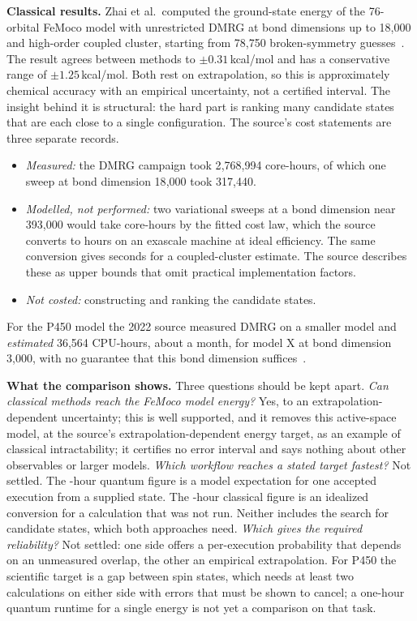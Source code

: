 \documentclass[10pt,a4paper]{article}
\begin{document}
\textbf{Classical results.} Zhai et al.\ computed the ground-state energy of the 76-orbital FeMoco model with unrestricted DMRG at bond dimensions up to 18{,}000 and high-order coupled cluster, starting from 78{,}750 broken-symmetry guesses~\cite{zhai2026}. The result agrees between methods to $\pm0.31$\,kcal/mol and has a conservative range of $\pm1.25$\,kcal/mol. Both rest on extrapolation, so this is approximately chemical accuracy with an empirical uncertainty, not a certified interval. The insight behind it is structural: the hard part is ranking many candidate states that are each close to a single configuration. The source's cost statements are three separate records.
\begin{itemize}
\item \emph{Measured:} the DMRG campaign took 2{,}768{,}994 core-hours, of which one sweep at bond dimension 18{,}000 took 317{,}440.
\item \emph{Modelled, not performed:} two variational sweeps at a bond dimension near 393{,}000 would take \femoClassCoreH{} core-hours by the fitted cost law, which the source converts to \femoClassIdeal{} hours on an exascale machine at ideal efficiency. The same conversion gives \femoUcc{} seconds for a coupled-cluster estimate. The source describes these as upper bounds that omit practical implementation factors.
\item \emph{Not costed:} constructing and ranking the candidate states.
\end{itemize}
For the P450 model the 2022 source measured DMRG on a smaller model and \emph{estimated} 36{,}564 CPU-hours, about a month, for model X at bond dimension 3{,}000, with no guarantee that this bond dimension suffices~\cite{goings2022}.

\textbf{What the comparison shows.} Three questions should be kept apart. \emph{Can classical methods reach the FeMoco model energy?} Yes, to an extrapolation-dependent uncertainty; this is well supported, and it removes this active-space model, at the source's extrapolation-dependent energy target, as an example of classical intractability; it certifies no error interval and says nothing about other observables or larger models. \emph{Which workflow reaches a stated target fastest?} Not settled. The \femoT-hour quantum figure is a model expectation for one accepted execution from a supplied state. The \femoClassIdeal-hour classical figure is an idealized conversion for a calculation that was not run. Neither includes the search for candidate states, which both approaches need. \emph{Which gives the required reliability?} Not settled: one side offers a per-execution probability that depends on an unmeasured overlap, the other an empirical extrapolation. For P450 the scientific target is a gap between spin states, which needs at least two calculations on either side with errors that must be shown to cancel; a one-hour quantum runtime for a single energy is not yet a comparison on that task.
\end{document}
